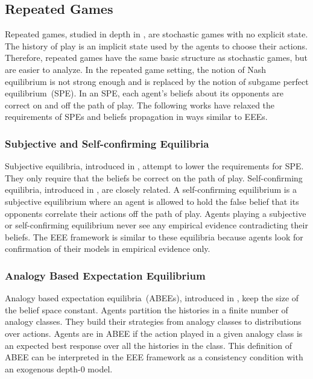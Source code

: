 \subsection{Repeated Games}
Repeated games, studied in depth in \cite{mailath_samuelson:2006}, are stochastic games with no explicit state.
The history of play is an implicit state used by the agents to choose their actions.
Therefore, repeated games have the same basic structure as stochastic games, but are easier to analyze.
In the repeated game setting, the notion of Nash equilibrium is not strong enough and is replaced by the notion of subgame perfect equilibrium~(SPE).
In an SPE, each agent's beliefs about its opponents are correct on and off the path of play.
The following works have relaxed the requirements of SPEs and beliefs propagation in ways similar to EEEs.

\subsubsection{Subjective and Self-confirming Equilibria}
Subjective equilibria, introduced in \cite{kalai_lehrer:1993:subjective}, attempt to lower the requirements for SPE.
They only require that the beliefs be correct on the path of play.
Self-confirming equilibria, introduced in \cite{fudenberg_levine:1993}, are closely related.
A self-confirming equilibrium is a subjective equilibrium where an agent is allowed to hold the false belief that its opponents correlate their actions off the path of play.
Agents playing a subjective or self-confirming equilibrium never see any empirical evidence contradicting their beliefs.
The EEE framework is similar to these equilibria because agents look for confirmation of their models in empirical evidence only.

\subsubsection{Analogy Based Expectation Equilibrium}
Analogy based expectation equilibria~(ABEEs), introduced in \cite{jehiel:2005}, keep the size of the belief space constant.
Agents partition the histories in a finite number of analogy classes.
They build their strategies from analogy classes to distributions over actions.
Agents are in ABEE if the action played in a given analogy class is an expected best response over all the histories in the class.
This definition of ABEE can be interpreted in the EEE framework as a consistency condition with an exogenous depth-\(0\) model.

